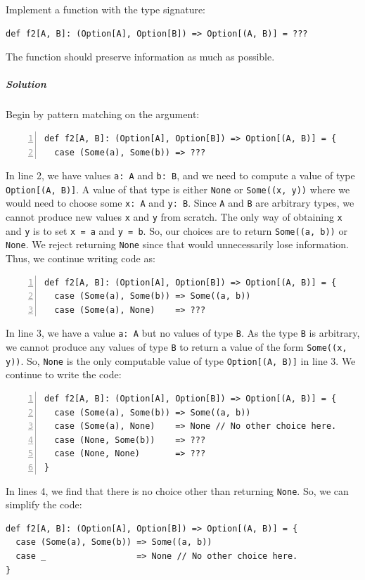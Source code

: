 Implement a function with the type signature:
\begin{lstlisting}
def f2[A, B]: (Option[A], Option[B]) => Option[(A, B)] = ???
\end{lstlisting}
The function should preserve information as much as possible.

\subparagraph{Solution}

Begin by pattern matching on the argument:
\begin{lstlisting}[numbers=left]
def f2[A, B]: (Option[A], Option[B]) => Option[(A, B)] = {
  case (Some(a), Some(b)) => ???
\end{lstlisting}
In line 2, we have values \lstinline!a: A! and \lstinline!b: B!,
and we need to compute a value of type \lstinline!Option[(A, B)]!.
A value of that type is either \lstinline!None! or \lstinline!Some((x, y))!
where we would need to choose some  \lstinline!x: A! and \lstinline!y: B!.
Since \lstinline!A! and \lstinline!B! are arbitrary types, we cannot
produce new values \lstinline!x! and \lstinline!y! from scratch.
The only way of obtaining \lstinline!x! and \lstinline!y! is to
set \lstinline!x = a! and \lstinline!y = b!. So, our choices are
to return \lstinline!Some((a, b))! or \lstinline!None!. We reject
returning \lstinline!None! since that would unnecessarily lose information.
Thus, we continue writing code as:
\begin{lstlisting}[numbers=left]
def f2[A, B]: (Option[A], Option[B]) => Option[(A, B)] = {
  case (Some(a), Some(b)) => Some((a, b))
  case (Some(a), None)    => ???
\end{lstlisting}
In line 3, we have a value \lstinline!a: A! but no values of type
\lstinline!B!. As the type \lstinline!B! is arbitrary, we cannot
produce any values of type \lstinline!B! to return a value of the
form \lstinline!Some((x, y))!. So, \lstinline!None! is the only
computable value of type \lstinline!Option[(A, B)]! in line 3. We
continue to write the code:
\begin{lstlisting}[numbers=left]
def f2[A, B]: (Option[A], Option[B]) => Option[(A, B)] = {
  case (Some(a), Some(b)) => Some((a, b))
  case (Some(a), None)    => None // No other choice here.
  case (None, Some(b))    => ???
  case (None, None)       => ???
}
\end{lstlisting}
In lines 4, we find that there is no choice other than
returning \lstinline!None!. So, we can simplify the code:
\begin{lstlisting}
def f2[A, B]: (Option[A], Option[B]) => Option[(A, B)] = {
  case (Some(a), Some(b)) => Some((a, b))
  case _                  => None // No other choice here.
}
\end{lstlisting}



